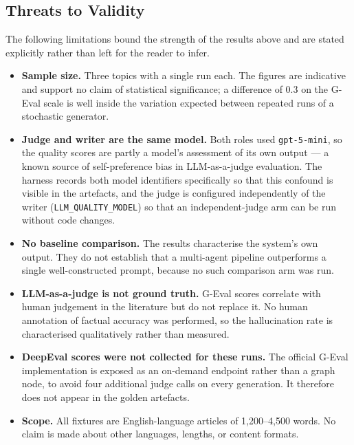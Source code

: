 \subsection{Threats to Validity}
\label{sec:threats}

The following limitations bound the strength of the results above and are stated
explicitly rather than left for the reader to infer.

\begin{itemize}
    \item \textbf{Sample size.} Three topics with a single run each. The figures
      are indicative and support no claim of statistical significance; a
      difference of 0.3 on the G-Eval scale is well inside the variation
      expected between repeated runs of a stochastic generator.

    \item \textbf{Judge and writer are the same model.} Both roles used
      \texttt{gpt-5-mini}, so the quality scores are partly a model's assessment
      of its own output --- a known source of self-preference bias in
      LLM-as-a-judge evaluation. The harness records both model identifiers
      specifically so that this confound is visible in the artefacts, and the
      judge is configured independently of the writer
      (\texttt{LLM\_QUALITY\_MODEL}) so that an independent-judge arm can be run
      without code changes.

    \item \textbf{No baseline comparison.} The results characterise the system's
      own output. They do not establish that a multi-agent pipeline outperforms
      a single well-constructed prompt, because no such comparison arm was run.

    \item \textbf{LLM-as-a-judge is not ground truth.} G-Eval scores correlate
      with human judgement in the literature but do not replace it. No human
      annotation of factual accuracy was performed, so the hallucination rate is
      characterised qualitatively rather than measured.

    \item \textbf{DeepEval scores were not collected for these runs.} The
      official G-Eval implementation is exposed as an on-demand endpoint rather
      than a graph node, to avoid four additional judge calls on every
      generation. It therefore does not appear in the golden artefacts.

    \item \textbf{Scope.} All fixtures are English-language articles of
      1,200--4,500 words. No claim is made about other languages, lengths, or
      content formats.


\end{itemize}
